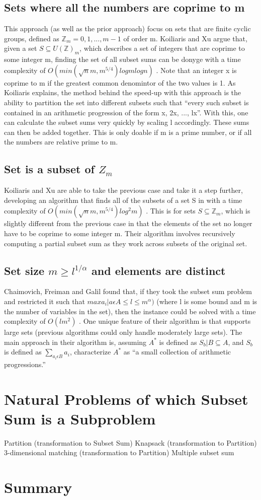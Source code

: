 \documentclass{article}
\begin{document}
\subsection{Sets where all the numbers are coprime to m}
This approach (as well as the prior approach) focus on sets that are finite
cyclic groups, defined as $\mathbb{Z}_m = {0, 1, ..., m-1}$ of order m.
Koiliaris and Xu argue that, given a set $S \subseteq U(\mathbb{Z})_m$, which
describes a set of integers that are coprime to some integer m, finding
the set of all subset sums can be donyge with a time complexity of
$O(min(\sqrt{n}m,m^{5/4})log m log n)$ \cite{koiliaris2016}.
Note that an integer x is
coprime to m if the greatest common denomintor of the two values is 1.
As Koiliaris explains, the method behind the speed-up with this approach
is the ability to partition the set into different subsets such that ``every
such subset is contained in an arithmetic progression of the form
x, 2x, ..., lx''. With this, one can calculate the subset sums very quickly
by scaling l accordingly. These sums can then be added together. This is
only doable if m is a prime number, or if all the numbers are relative prime
to m.

\subsection{Set is a subset of $Z_m$}
Koiliaris and Xu are able to take the previous case and take it a step further,
developing an algorithm that finds all of the subsets of a set S in with a
time complexity of $O(min(\sqrt{n}m,m^{5/4})log^2m)$  \cite{koiliaris2016}.
This is for sets $S \subseteq \mathbb{Z}_m$, which is slightly different from
the previous case in that the elements of the set no longer have to be
coprime to some integer m.
Their algorithm involves recursively computing a partial subset sum
as they work across subsets of the original set.

\subsection{Set size $m \geq l^{1/\alpha}$ and elements are distinct}
Chaimovich, Freiman and Galil found that, if they took the subset sum
problem and restricted it such that $max{a_i | a \epsilon A} \leq l \leq
m^\alpha)$ (where l is some bound and m is the number of variables in the set),
then the instance could be solved with a time complexity of $O(lm^2)$
\cite{chaimovich1989}. One unique
feature of their algorithm is that supports large sets (previous algorithms
could only handle moderately large sets). The main approach in their algorithm
is, assuming $A^*$ is defined as ${S_b | B \subseteq A}$, and $S_b$ is
defined as $\sum_{a_i\epsilon B} a_i$, characterize $A^*$ as ``a small
collection of
arithmetic progressions.'' 

\section{Natural Problems of which Subset Sum is a Subproblem}
Partition (transformation to Subset Sum)
Knapsack (transformation to Partition)
3-dimensional matching (transformation to Partition)
Multiple subset sum 

\section{Summary}



\end{document}
